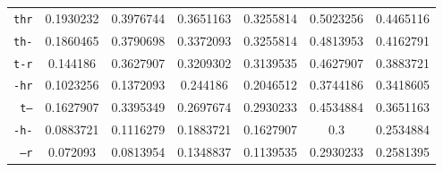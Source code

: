 \documentclass[../main.tex]{subfiles}
\begin{document}
\begin{table}[ht]
\begin{small}
\begin{tabular}{|r|c|c|c|c|c|c|}
		\hline
		\texttt{thr} & 0.1930232 & 0.3976744 & 0.3651163 & 0.3255814 & 0.5023256 & 0.4465116 \\
		\texttt{th-} & 0.1860465 & 0.3790698 & 0.3372093 & 0.3255814 & 0.4813953 & 0.4162791 \\
		\texttt{t-r} & 0.144186 & 0.3627907 & 0.3209302 & 0.3139535 & 0.4627907 & 0.3883721 \\
		\texttt{-hr} & 0.1023256 & 0.1372093 & 0.244186 & 0.2046512 & 0.3744186 & 0.3418605 \\
		\texttt{t--} & 0.1627907 & 0.3395349 & 0.2697674 & 0.2930233 & 0.4534884 & 0.3651163 \\
		\texttt{-h-} & 0.0883721 & 0.1116279 & 0.1883721 & 0.1627907 & 0.3 & 0.2534884 \\
		\texttt{--r} & 0.072093 & 0.0813954 & 0.1348837 & 0.1139535 & 0.2930233 & 0.2581395 \\
		\hline
	\end{tabular}
	\end{small}
\end{table}
\end{document}
